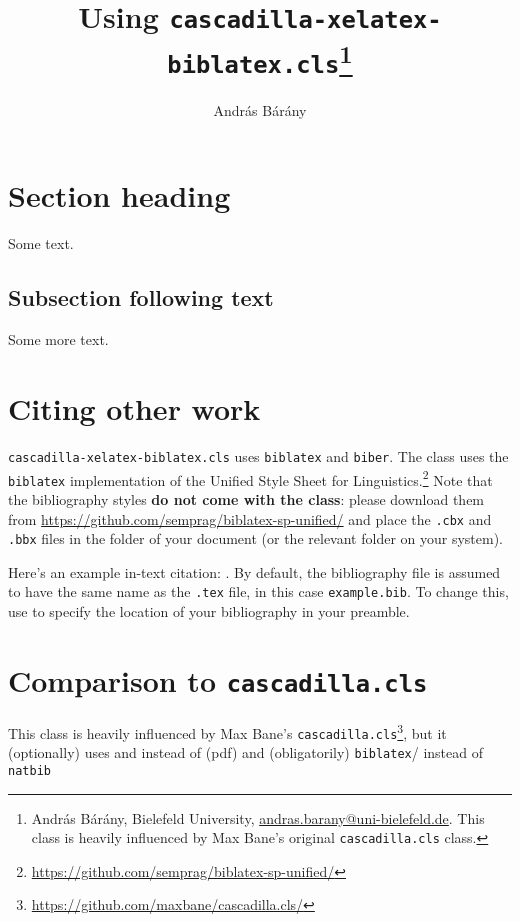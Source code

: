\documentclass{cascadilla-xelatex-biblatex}
\title{Using \texttt{cascadilla-xelatex-biblatex.cls}\thanks{András Bárány,
        Bielefeld University,
\url{andras.barany@uni-bielefeld.de}. This class is heavily influenced by Max
Bane's original \texttt{cascadilla.cls} class.}}
\author{András Bárány}
\begin{document}
\maketitle

\section{Section heading}


Some text.

\subsection{Subsection following text}


Some more text.

\section{Citing other work}

\texttt{cascadilla-xelatex-biblatex.cls} uses \texttt{biblatex} and
\texttt{biber}. The class uses the \texttt{biblatex} implementation of the
Unified Style Sheet for
Linguistics.\footnote{\url{https://github.com/semprag/biblatex-sp-unified/}}
Note that the bibliography styles \textbf{do not come with the class}: please
download them from \url{https://github.com/semprag/biblatex-sp-unified/} and
place the \texttt{.cbx} and \texttt{.bbx} files in the folder of your document
(or the relevant folder on your system).

Here's an example in-text citation: \textcite{EKiss2008}. By default, the
bibliography file is assumed to have the same name as the \texttt{.tex} file,
in this case \texttt{example.bib}. To change this, use
\verb++ to specify the location of your bibliography in
your preamble.

\section{Comparison to \texttt{cascadilla.cls}}

This class is heavily influenced by Max Bane's
\texttt{cascadilla.cls}\footnote{\url{https://github.com/maxbane/cascadilla.cls/}},
but it (optionally) uses  and instead of (pdf)
and (obligatorily) \texttt{biblatex}/ instead of \texttt{natbib}
\end{document}
